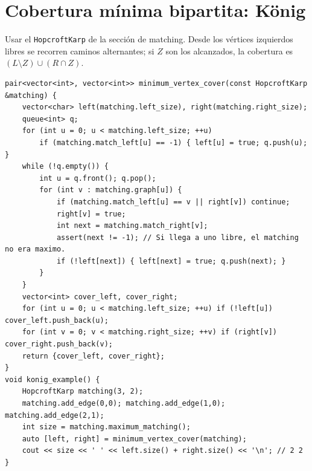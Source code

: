 \section{Cobertura m\'inima bipartita: K\"onig}

Usar el \texttt{HopcroftKarp} de la secci\'on de matching. Desde los v\'ertices
izquierdos libres se recorren caminos alternantes; si $Z$ son los alcanzados,
la cobertura es $(L\setminus Z)\cup(R\cap Z)$.

\begin{lstlisting}[style=cpp]
pair<vector<int>, vector<int>> minimum_vertex_cover(const HopcroftKarp &matching) {
    vector<char> left(matching.left_size), right(matching.right_size);
    queue<int> q;
    for (int u = 0; u < matching.left_size; ++u)
        if (matching.match_left[u] == -1) { left[u] = true; q.push(u); }
    while (!q.empty()) {
        int u = q.front(); q.pop();
        for (int v : matching.graph[u]) {
            if (matching.match_left[u] == v || right[v]) continue;
            right[v] = true;
            int next = matching.match_right[v];
            assert(next != -1); // Si llega a uno libre, el matching no era maximo.
            if (!left[next]) { left[next] = true; q.push(next); }
        }
    }
    vector<int> cover_left, cover_right;
    for (int u = 0; u < matching.left_size; ++u) if (!left[u]) cover_left.push_back(u);
    for (int v = 0; v < matching.right_size; ++v) if (right[v]) cover_right.push_back(v);
    return {cover_left, cover_right};
}
void konig_example() {
    HopcroftKarp matching(3, 2);
    matching.add_edge(0,0); matching.add_edge(1,0); matching.add_edge(2,1);
    int size = matching.maximum_matching();
    auto [left, right] = minimum_vertex_cover(matching);
    cout << size << ' ' << left.size() + right.size() << '\n'; // 2 2
}
\end{lstlisting}


